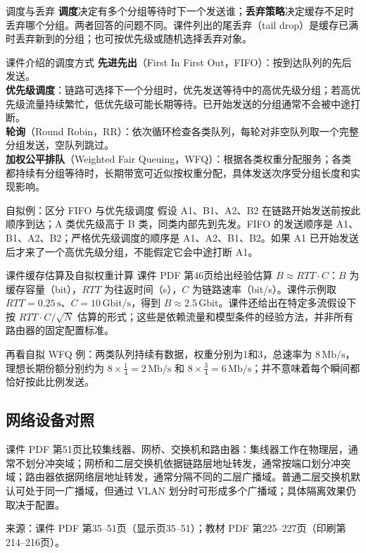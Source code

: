 \begin{definition}{调度与丢弃}
\textbf{调度}决定有多个分组等待时下一个发送谁；\textbf{丢弃策略}决定缓存不足时丢弃哪个分组。两者回答的问题不同。课件列出的尾丢弃（tail drop）是缓存已满时丢弃新到的分组；也可按优先级或随机选择丢弃对象。
\end{definition}

\begin{proposition}{课件介绍的调度方式}
\textbf{先进先出}（First In First Out，FIFO）：按到达队列的先后发送。\\
\textbf{优先级调度}：链路可选择下一个分组时，优先发送等待中的高优先级分组；若高优先级流量持续繁忙，低优先级可能长期等待。已开始发送的分组通常不会被中途打断。\\
\textbf{轮询}（Round Robin，RR）：依次循环检查各类队列，每轮对非空队列取一个完整分组发送，空队列跳过。\\
\textbf{加权公平排队}（Weighted Fair Queuing，WFQ）：根据各类权重分配服务；各类都持续有分组等待时，长期带宽可近似按权重分配，具体发送次序受分组长度和实现影响。
\end{proposition}

\begin{example}{自拟例：区分 FIFO 与优先级调度}
假设 A1、B1、A2、B2 在链路开始发送前按此顺序到达；A 类优先级高于 B 类，同类内部先到先发。FIFO 的发送顺序是 A1、B1、A2、B2；严格优先级调度的顺序是 A1、A2、B1、B2。如果 A1 已开始发送后才来了一个高优先级分组，不能假定它会中途打断 A1。
\end{example}

\begin{example}{课件缓存估算及自拟权重计算}
课件 PDF 第46页给出经验估算 $B\approx RTT\cdot C$：$B$ 为缓存容量（bit），$RTT$ 为往返时间（s），$C$ 为链路速率（bit/s）。课件示例取 $RTT=0.25\,\mathrm{s}$、$C=10\,\mathrm{Gbit/s}$，得到 $B\approx2.5\,\mathrm{Gbit}$。课件还给出在特定多流假设下按 $RTT\cdot C/\sqrt N$ 估算的形式；这些是依赖流量和模型条件的经验方法，并非所有路由器的固定配置标准。

再看自拟 WFQ 例：两类队列持续有数据，权重分别为1和3，总速率为 $8\,\mathrm{Mb/s}$，理想长期份额分别约为 $8\times\frac14=2\,\mathrm{Mb/s}$ 和 $8\times\frac34=6\,\mathrm{Mb/s}$；并不意味着每个瞬间都恰好按此比例发送。
\end{example}
\annotationarea[4]

\subsection{网络设备对照}
课件 PDF 第51页比较集线器、网桥、交换机和路由器：集线器工作在物理层，通常不划分冲突域；网桥和二层交换机依据链路层地址转发，通常按端口划分冲突域；路由器依据网络层地址转发，通常分隔不同的二层广播域。普通二层交换机默认可处于同一广播域，但通过 VLAN 划分时可形成多个广播域；具体隔离效果仍取决于配置。\par\small\noindent 来源：课件 PDF 第35--51页（显示页35--51）；教材 PDF 第225--227页（印刷第214--216页）。\normalsize

